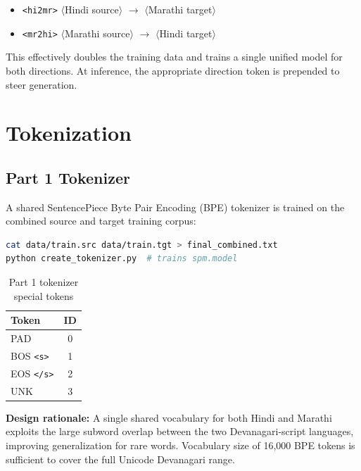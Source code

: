 \documentclass[12pt,a4paper]{article}
\begin{document}
\begin{itemize}
    \item \texttt{<hi2mr>} $\langle$Hindi source$\rangle$ $\to$ $\langle$Marathi target$\rangle$
    \item \texttt{<mr2hi>} $\langle$Marathi source$\rangle$ $\to$ $\langle$Hindi target$\rangle$
\end{itemize}

This effectively doubles the training data and trains a single unified model for both directions. At inference, the appropriate direction token is prepended to steer generation.

\section{Tokenization}

\subsection{Part 1 Tokenizer}

A shared SentencePiece Byte Pair Encoding (BPE) tokenizer is trained on the combined source and target training corpus:

\begin{lstlisting}[language=bash, caption={Tokenizer training for Part 1}]
cat data/train.src data/train.tgt > final_combined.txt
python create_tokenizer.py  # trains spm.model
\end{lstlisting}

\begin{table}[H]
\centering
\caption{Part 1 tokenizer special tokens}
\begin{tabular}{lc}
\toprule
\textbf{Token} & \textbf{ID} \\
\midrule
PAD & 0 \\
BOS \texttt{<s>} & 1 \\
EOS \texttt{</s>} & 2 \\
UNK & 3 \\
\bottomrule
\end{tabular}
\end{table}

\textbf{Design rationale:} A single shared vocabulary for both Hindi and Marathi exploits the large subword overlap between the two Devanagari-script languages, improving generalization for rare words. Vocabulary size of 16,000 BPE tokens is sufficient to cover the full Unicode Devanagari range.
\end{document}
